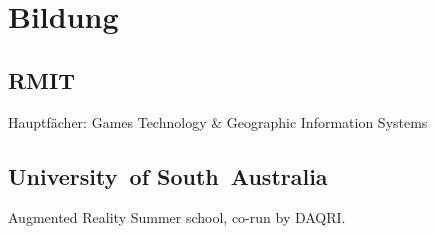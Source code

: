 \documentclass[a4paper]{deedy-resume_twopage} %
\begin{document}
\begin{minipage}[t]{0.33\textwidth} %


  \section{Bildung}

  \subsection{RMIT}

  Hauptfächer: Games Technology \& Geographic Information Systems \\

  \sectionspace %

  \subsection{University\hbox{ }of South~Australia}


  Augmented Reality Summer school, co-run by DAQRI. \\

  \sectionspace %




\end{minipage}
\end{document}
